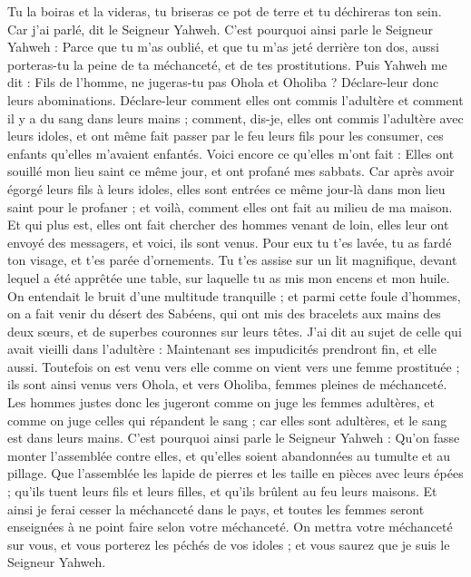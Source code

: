 \begin{multicols}{2}
Tu la boiras et la videras, tu briseras ce pot de terre et tu déchireras ton sein. Car j'ai parlé, dit le Seigneur Yahweh.
C'est pourquoi ainsi parle le Seigneur Yahweh : Parce que tu m'as oublié, et que tu m'as jeté derrière ton dos, aussi porteras-tu la peine de ta méchanceté, et de tes prostitutions.
Puis Yahweh me dit : Fils de l’homme, ne jugeras-tu pas Ohola et Oholiba ? Déclare-leur donc leurs abominations.
Déclare-leur comment elles ont commis l’adultère et comment il y a du sang dans leurs mains ; comment, dis-je, elles ont commis l’adultère avec leurs idoles, et ont même fait passer par le feu leurs fils pour les consumer, ces enfants qu'elles m'avaient enfantés.
Voici encore ce qu'elles m'ont fait : Elles ont souillé mon lieu saint ce même jour, et ont profané mes sabbats.
Car après avoir égorgé leurs fils à leurs idoles, elles sont entrées ce même jour-là dans mon lieu saint pour le profaner ; et voilà, comment elles ont fait au milieu de ma maison\FTNT{}.
Et qui plus est, elles ont fait chercher des hommes venant de loin, elles leur ont envoyé des messagers, et voici, ils sont venus. Pour eux tu t'es lavée, tu as fardé ton visage, et t'es parée d'ornements.
Tu t'es assise sur un lit magnifique, devant lequel a été apprêtée une table, sur laquelle tu as mis mon encens et mon huile.
On entendait le bruit d’une multitude tranquille ; et parmi cette foule d’hommes, on a fait venir du désert des Sabéens, qui ont mis des bracelets aux mains des deux sœurs, et de superbes couronnes sur leurs têtes.
J'ai dit au sujet de celle qui avait vieilli dans l'adultère : Maintenant ses impudicités prendront fin, et elle aussi.
Toutefois on est venu vers elle comme on vient vers une femme prostituée ; ils sont ainsi venus vers Ohola, et vers Oholiba, femmes pleines de méchanceté.
Les hommes justes donc les jugeront comme on juge les femmes adultères, et comme on juge celles qui répandent le sang ; car elles sont adultères, et le sang est dans leurs mains.
C'est pourquoi ainsi parle le Seigneur Yahweh : Qu'on fasse monter l'assemblée contre elles, et qu'elles soient abandonnées au tumulte et au pillage.
Que l'assemblée les lapide de pierres et les taille en pièces avec leurs épées ; qu'ils tuent leurs fils et leurs filles, et qu'ils brûlent au feu leurs maisons.
Et ainsi je ferai cesser la méchanceté dans le pays, et toutes les femmes seront enseignées à ne point faire selon votre méchanceté.
On mettra votre méchanceté sur vous, et vous porterez les péchés de vos idoles ; et vous saurez que je suis le Seigneur Yahweh.

\end{multicols}
